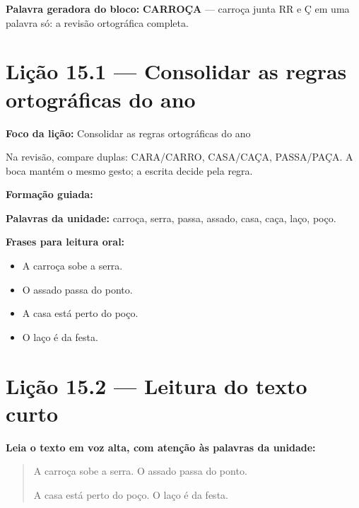 \textbf{Palavra geradora do bloco:} \textbf{CARROÇA} --- carroça junta RR e Ç em uma palavra só: a revisão ortográfica completa.

\section{Lição 15.1 --- Consolidar as regras ortográficas do ano}

\textbf{Foco da lição:} Consolidar as regras ortográficas do ano


\begin{boquinha}
Na revisão, compare duplas: CARA/CARRO, CASA/CAÇA, PASSA/PAÇA. A boca mantém o mesmo gesto; a escrita decide pela regra.
\end{boquinha}

\noindent\textbf{Formação guiada:}

\begin{center}
\end{center}

\noindent\textbf{Palavras da unidade:} carroça, serra, passa, assado, casa, caça, laço, poço.

\noindent\textbf{Frases para leitura oral:}
\begin{itemize}[leftmargin=1.6em]
  \item A carroça sobe a serra.
  \item O assado passa do ponto.
  \item A casa está perto do poço.
  \item O laço é da festa.
\end{itemize}

\section{Lição 15.2 --- Leitura do texto curto}

\noindent\textbf{Leia o texto em voz alta, com atenção às palavras da unidade:}


\begin{quote}
A carroça sobe a serra. O assado passa do ponto.

A casa está perto do poço. O laço é da festa.
\end{quote}

